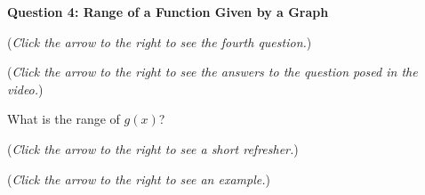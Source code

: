 \documentclass{ximera}
\begin{document}
\textbf{Question 4: Range of a Function Given by a Graph}
\begin{question}
\begin{flushright}
{\color{blue}(\emph{Click the arrow to the right to see the fourth question.})}
\end{flushright}
\begin{center}
\begin{expandable}
{\color{blue}(\emph{Click the arrow to the right to see the answers 
to the question posed in the video.})}
\begin{expandable}
What is the range of $g(x)$?
\begin{multipleChoice}
\choice{$[-1,1)\cup(1,3]\cup[4,6]$}
\choice{$[-1,3]\cup[4,6]$}
\choice[correct]{$\{2\} \cup [6,15)$}
\choice{$\{2\}\cup [9,15)$}
\choice{$\{2\} \cup [6,9)$}
\end{multipleChoice}
\begin{flushright}
{\color{blue}(\emph{Click the arrow to the right to see a short refresher.})}
\end{flushright}
\begin{expandable}
\end{expandable}
\begin{flushright}
{\color{blue}(\emph{Click the arrow to the right to see an example.})}
\end{flushright}
\begin{expandable}
\end{expandable}
\end{expandable}
\end{expandable}
\end{center}
\end{question}
\end{document}
